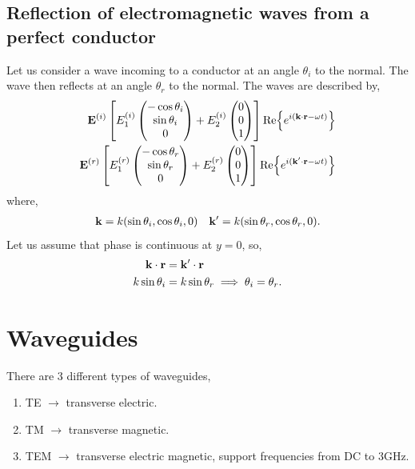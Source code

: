 \documentclass{book}
\begin{document}
\subsection{Reflection of electromagnetic waves from a perfect conductor}
Let us consider a wave incoming to a conductor at an angle $\theta_i$ to the normal. The wave then reflects at an angle $\theta_r$ to the normal. The waves are described by,
\begin{align}
	\vb{E}^{(i)}\left[E_1^{(i)} \begin{pmatrix}
		-\cos\theta_i \\ \sin\theta_i \\ 0
	\end{pmatrix} + E_2^{(i)}\begin{pmatrix}
	0 \\ 0 \\ 1
	\end{pmatrix}\right]\Re{e^{i(\vb{k}\cdot\vb{r} - \omega t)}} \\ \vb{E}^{(r)}\left[E_1^{(r)} \begin{pmatrix}
	-\cos\theta_r \\ \sin\theta_r \\ 0
	\end{pmatrix} + E_2^{(r)}\begin{pmatrix}
	0 \\ 0 \\ 1
	\end{pmatrix}\right]\Re{e^{i(\vb{k}'\cdot\vb{r} - \omega t)}}
\end{align}
where,
\begin{align}
	\vb{k} = k(\sin\theta_i, \cos\theta_i, 0) && \vb{k}' = k(\sin\theta_r, \cos\theta_r, 0).
\end{align}
Let us assume that phase is continuous at $y = 0$, so,
\begin{equation}
	\begin{split}
		\vb{k}\cdot\vb{r} & = \vb{k}'\cdot\vb{r} \\
		k\sin\theta_i & = k\sin\theta_r \implies \theta_i = \theta_r.
	\end{split}
\end{equation}
\section{Waveguides}
There are 3 different types of waveguides,
\begin{enumerate}
	\item TE $\to$ transverse electric.
	\item TM $\to$ transverse magnetic.
	\item TEM $\to$ transverse electric magnetic, support frequencies from DC to 3GHz.
\end{enumerate}
\end{document}
